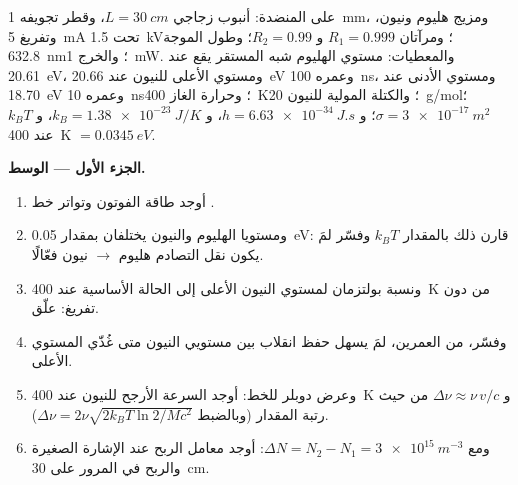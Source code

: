 \begin{problem}\label{pb:b2:laser:1}
 على المنضدة: أنبوب زجاجي $L = \qty{30}{cm}$، وقطر تجويفه
\qty{1}{mm}، ومزيج هليوم ونيون، وتفريغ \qty{5}{mA} تحت
\qty{1.5}{kV}؛ ومرآتان $R_1 = 0.999$ و $R_2 = 0.99$؛ وطول الموجة
\qty{632.8}{nm}؛ والخرج \qty{1}{mW}. والمعطيات: مستوي الهليوم شبه المستقر يقع
عند \qty{20.61}{eV}، ومستوي  الأعلى للنيون عند \qty{20.66}{eV} وعمره
\qty{100}{ns}، ومستوي  الأدنى عند \qty{18.70}{eV} وعمره
\qty{10}{ns}؛ وحرارة الغاز \qty{400}{K}؛ والكتلة المولية للنيون
\qty{20}{g/mol}؛  $\sigma = \qty{3e-17}{m^2}$؛ و $h =
\qty{6.63e-34}{J.s}$، و $k_B = \qty{1.38e-23}{J/K}$، و $k_BT$ عند \qty{400}{K}
$= \qty{0.0345}{eV}$.

\textbf{الجزء الأول --- الوسط.}
\begin{enumerate}
  \item أوجد طاقة الفوتون وتواتر خط .
  \item ومستويا الهليوم والنيون يختلفان بمقدار \qty{0.05}{eV}: قارن ذلك بالمقدار
        $k_BT$ وفسّر لمَ يكون نقل التصادم هليوم $\to$ نيون
        فعّالًا.
  \item ونسبة بولتزمان لمستوي النيون الأعلى إلى الحالة الأساسية عند
        \qty{400}{K} من دون تفريغ: علّق.
  \item وفسّر، من العمرين، لمَ يسهل حفظ انقلاب بين
        مستويي النيون متى غُذّي المستوي الأعلى.
  \item وعرض دوبلر للخط: أوجد السرعة الأرجح للنيون عند
        \qty{400}{K} و $\Delta\nu \approx \nu\,v/c$ من حيث رتبة
        المقدار (وبالضبط $\Delta\nu = 2\nu\sqrt{2k_BT\ln2/Mc^2}$).
  \item ومع $\Delta N = N_2 - N_1 = \qty{3e15}{m^{-3}}$: أوجد معامل الربح
        عند الإشارة الصغيرة والربح في المرور على \qty{30}{cm}.
\end{enumerate}


\end{problem}
